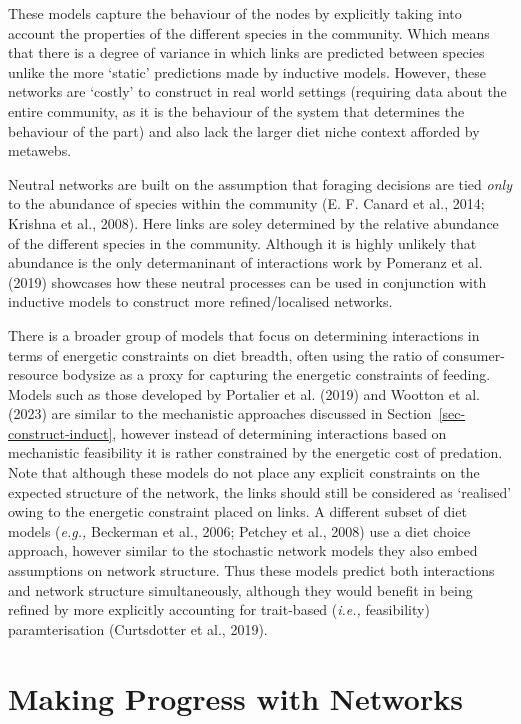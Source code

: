 \documentclass[
]{article}
\begin{document}
These models capture the behaviour of the nodes by explicitly taking
into account the properties of the different species in the community.
Which means that there is a degree of variance in which links are
predicted between species unlike the more `static' predictions made by
inductive models. However, these networks are `costly' to construct in
real world settings (requiring data about the entire community, as it is
the behaviour of the system that determines the behaviour of the part)
and also lack the larger diet niche context afforded by metawebs.

Neutral networks are built on the assumption that foraging decisions are
tied \emph{only} to the abundance of species within the community (E. F.
Canard et al., 2014; Krishna et al., 2008). Here links are soley
determined by the relative abundance of the different species in the
community. Although it is highly unlikely that abundance is the only
determaninant of interactions work by Pomeranz et al. (2019) showcases
how these neutral processes can be used in conjunction with inductive
models to construct more refined/localised networks.

There is a broader group of models that focus on determining
interactions in terms of energetic constraints on diet breadth, often
using the ratio of consumer-resource bodysize as a proxy for capturing
the energetic constraints of feeding. Models such as those developed by
Portalier et al. (2019) and Wootton et al. (2023) are similar to the
mechanistic approaches discussed in Section~\ref{sec-construct-induct},
however instead of determining interactions based on mechanistic
feasibility it is rather constrained by the energetic cost of predation.
Note that although these models do not place any explicit constraints on
the expected structure of the network, the links should still be
considered as `realised' owing to the energetic constraint placed on
links. A different subset of diet models (\emph{e.g.,} Beckerman et al.,
2006; Petchey et al., 2008) use a diet choice approach, however similar
to the stochastic network models they also embed assumptions on network
structure. Thus these models predict both interactions and network
structure simultaneously, although they would benefit in being refined
by more explicitly accounting for trait-based (\emph{i.e.,} feasibility)
paramterisation (Curtsdotter et al., 2019).

\section{Making Progress with Networks}\label{sec-progress}
\end{document}
